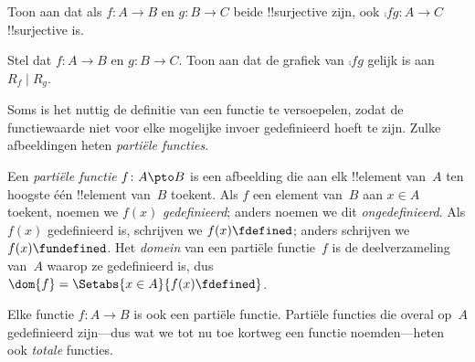 \documentclass[openany]{memoir}
\begin{document}
\begin{prob}
Toon aan dat als $f \colon A \to B$ en $g \colon B \to C$ beide
!!{surjective} zijn, ook $\comp{f}{g}\colon A \to C$ !!{surjective}
is.
\end{prob}

\begin{prob}
Stel dat $f \colon A \to B$ en $g \colon B \to C$. Toon aan dat de
grafiek van $\comp{f}{g}$ gelijk is aan $R_f \mid R_g$.
\end{prob}
\endgroup

\begingroup
\def\olfilename{OLP-0026}
\def\olfilepath{content/sets-functions-relations/functions/}
\hypertarget{unit-OLP-0026}{}






\begin{explain}
Soms is het nuttig de definitie van een functie te versoepelen, zodat
de functiewaarde niet voor elke mogelijke invoer gedefinieerd hoeft te
zijn. Zulke afbeeldingen heten \emph{partiële functies}.
\end{explain}

\begin{defn}
Een \emph{partiële functie} $f \colon A \pto B$ is een afbeelding die
aan elk !!{element} van~$A$ ten hoogste één !!{element} van~$B$
toekent. Als $f$ een element van~$B$ aan $x \in A$ toekent, noemen
we $f(x)$ \emph{gedefinieerd}; anders noemen we dit
\emph{ongedefinieerd}. Als $f(x)$ gedefinieerd is, schrijven we $f(x)
\fdefined$; anders schrijven we $f(x) \fundefined$. Het
\emph{domein} van een partiële functie~$f$ is de deelverzameling
van~$A$ waarop ze gedefinieerd is, dus $\dom{f} = \Setabs{x \in
A}{f(x) \fdefined}$.
\end{defn}

\begin{ex}
Elke functie $f\colon A \to B$ is ook een partiële functie. Partiële
functies die overal op~$A$ gedefinieerd zijn---dus wat we tot nu toe
kortweg een functie noemden---heten ook \emph{totale} functies.
\end{ex}
\end{document}

